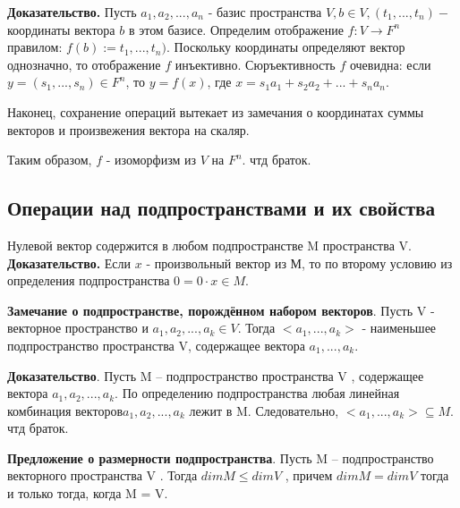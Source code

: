 \documentclass[a4paper]{article}
\begin{document}
    \begin{hproof}
        \textbf{Доказательство.} Пусть $a_1, a_2, ..., a_n$ - базис пространства $V, b \in V, (t_1, ..., t_n) - $ координаты вектора $b$ в этом базисе. Определим отображение $f: V \rightarrow F^n$ правилом: $f(b) := t_1, ..., t_n)$. Поскольку координаты определяют вектор однозначно, то отображение $f$ инъективно. Сюръективность $f$ очевидна: если $y = (s_1, ..., s_n) \in F^n$, то $y = f(x)$, где $x = s_1a_1 + s_2a_2 + ... + s_na_n$.

        Наконец, сохранение операций вытекает из замечания о координатах суммы векторов и произвежения вектора на скаляр.

        Таким образом, $f$ - изоморфизм из $V$ на $F^n$. чтд браток.
    \end{hproof}

    \subsection*{Операции над подпространствами и их свойства}

    Нулевой вектор содержится в любом подпространстве M пространства V.
    \textbf{Доказательство.} Если $x$ - произвольный вектор из М, то по второму условию из определения подпространства $0 = 0 \cdot x \in M$.

    \begin{htheorem}
        \textbf{Замечание о подпространстве, порождённом набором векторов}. Пусть V - векторное пространство и $a_1, a_2, ..., a_k \in V$. Тогда $<a_1, ..., a_k>$ - наименьшее подпространство пространства V, содержащее вектора $a_1, ..., a_k$.
    \end{htheorem}


    \begin{hproof}
        \textbf{Доказательство}. Пусть M – подпространство пространства V , содержащее
        вектора $a_1, a_2, ..., a_k$. По определению подпространства любая линейная
        комбинация векторов$a_1, a_2, ..., a_k$ лежит в M. Следовательно,
        $<a_1, ..., a_k> \subseteq M$. чтд браток.
    \end{hproof}


    \begin{htheorem}
        \textbf{Предложение о размерности подпространства}.
        Пусть M – подпространство векторного пространства V . Тогда
        $dim M \leq dim V$ , причем $dim M = dim V$ тогда и только тогда, когда
        M = V.
    \end{htheorem}
\end{document}
